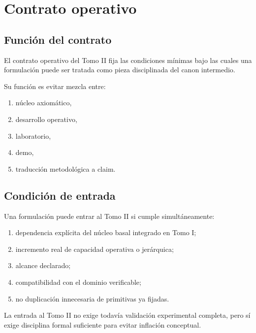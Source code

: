 \chapter{Contrato operativo}

\section{Función del contrato}
\begin{observation}
El contrato operativo del Tomo II fija las condiciones mínimas bajo las cuales una formulación puede ser tratada como pieza disciplinada del canon intermedio.
\end{observation}

\begin{observation}
Su función es evitar mezcla entre:
\begin{enumerate}
  \item núcleo axiomático,
  \item desarrollo operativo,
  \item laboratorio,
  \item demo,
  \item traducción metodológica a claim.
\end{enumerate}
\end{observation}

\section{Condición de entrada}
\begin{definition}
Una formulación puede entrar al Tomo II si cumple simultáneamente:
\begin{enumerate}
  \item dependencia explícita del núcleo basal integrado en Tomo I;
  \item incremento real de capacidad operativa o jerárquica;
  \item alcance declarado;
  \item compatibilidad con el dominio verificable;
  \item no duplicación innecesaria de primitivas ya fijadas.
\end{enumerate}
\end{definition}

\begin{observation}
La entrada al Tomo II no exige todavía validación experimental completa, pero sí exige disciplina formal suficiente para evitar inflación conceptual.
\end{observation}

